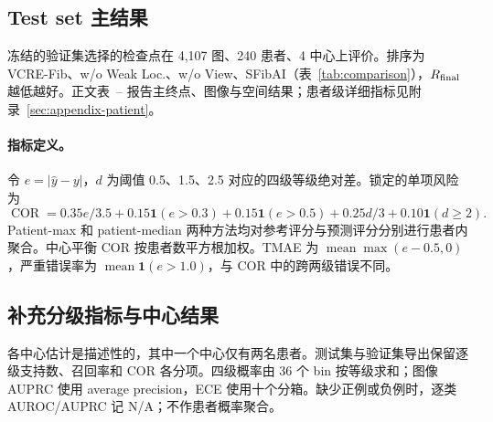 \subsection{Test set 主结果}
冻结的验证集选择的检查点在 4,107 图、240 患者、4 中心上评价。排序为 VCRE-Fib、w/o Weak Loc.、w/o View、SFibAI（表~\ref{tab:comparison}），$R_{\mathrm{final}}$ 越低越好。正文表~-- 报告主终点、图像与空间结果；患者级详细指标见附录~\ref{sec:appendix-patient}。

\paragraph{指标定义。}
令 $e=|\hat y-y|$，$d$ 为阈值 0.5、1.5、2.5 对应的四级等级绝对差。锁定的单项风险为
\[
\operatorname{COR}=0.35e/3.5+0.15\mathbf{1}(e>0.3)+0.15\mathbf{1}(e>0.5)+0.25d/3+0.10\mathbf{1}(d\ge2).
\]
Patient-max 和 patient-median 两种方法均对参考评分与预测评分分别进行患者内聚合。中心平衡 COR 按患者数平方根加权。TMAE 为 $\operatorname{mean}\max(e-0.5,0)$，严重错误率为 $\operatorname{mean}\mathbf{1}(e>1.0)$，与 COR 中的跨两级错误不同。

\subsection{补充分级指标与中心结果}
各中心估计是描述性的，其中一个中心仅有两名患者。测试集与验证集导出保留逐级支持数、召回率和 COR 各分项。四级概率由 36 个 bin 按等级求和；图像 AUPRC 使用 average precision，ECE 使用十个分箱。缺少正例或负例时，逐类 AUROC/AUPRC 记 N/A；不作患者概率聚合。
\FloatBarrier
